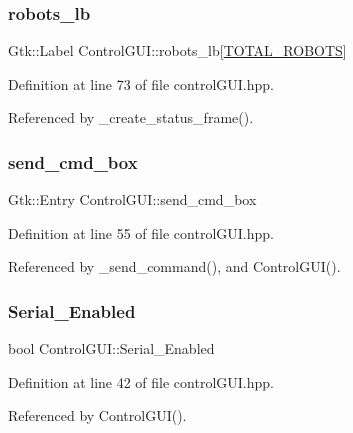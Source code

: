 \subsubsection{\texorpdfstring{robots\+\_\+lb}{robots\_lb}}
{\footnotesize\ttfamily Gtk\+::\+Label Control\+G\+U\+I\+::robots\+\_\+lb\mbox{[}\hyperlink{class_control_g_u_i_a5a2c1a15c09444b56794705721ba73fa}{T\+O\+T\+A\+L\+\_\+\+R\+O\+B\+O\+TS}\mbox{]}}



Definition at line 73 of file control\+G\+U\+I.\+hpp.



Referenced by \+\_\+create\+\_\+status\+\_\+frame().

\mbox{\label{class_control_g_u_i_a0cafb8350874db85af1fc59d21b61451}} 
\subsubsection{\texorpdfstring{send\+\_\+cmd\+\_\+box}{send\_cmd\_box}}
{\footnotesize\ttfamily Gtk\+::\+Entry Control\+G\+U\+I\+::send\+\_\+cmd\+\_\+box}



Definition at line 55 of file control\+G\+U\+I.\+hpp.



Referenced by \+\_\+send\+\_\+command(), and Control\+G\+U\+I().

\mbox{\label{class_control_g_u_i_aa3364ab85cac455c12942d46cf94c7e1}} 
\subsubsection{\texorpdfstring{Serial\+\_\+\+Enabled}{Serial\_Enabled}}
{\footnotesize\ttfamily bool Control\+G\+U\+I\+::\+Serial\+\_\+\+Enabled}



Definition at line 42 of file control\+G\+U\+I.\+hpp.



Referenced by Control\+G\+U\+I().

\mbox{\label{class_control_g_u_i_ad1d02aca34fe1f740970cb85311317bf}} 
